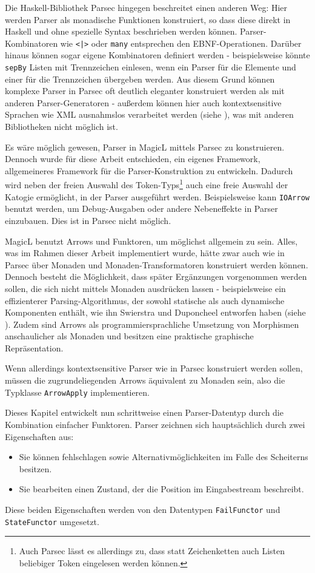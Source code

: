 \documentclass[11pt, a4paper, bibgerm]{scrbook}
\newcommand\icode[1]{\lstinline?#1?}
\begin{document}
Die Haskell-Bibliothek Parsec\cite{Parsec} hingegen beschreitet einen
anderen Weg: Hier werden Parser als monadische Funktionen konstruiert,
so dass diese direkt in Haskell und ohne spezielle Syntax beschrieben
werden können. Parser-Kombinatoren wie \icode{<|>} oder \icode{many}
entsprechen den EBNF-Operationen. Darüber hinaus können sogar eigene
Kombinatoren definiert werden - beispielsweise könnte \icode{sepBy}
Listen mit Trennzeichen einlesen, wenn ein Parser für die Elemente und
einer für die Trennzeichen übergeben werden. Aus diesem Grund können
komplexe Parser in Parsec oft deutlich eleganter konstruiert werden als
mit anderen Parser-Generatoren - außerdem können hier auch
kontextsensitive Sprachen wie XML ausnahmslos verarbeitet werden (siehe
\cite[S. 3]{Parsec}), was mit anderen Bibliotheken nicht möglich ist.

Es wäre möglich gewesen, Parser in MagicL mittels Parsec zu
konstruieren. Dennoch wurde für diese Arbeit entschieden, ein eigenes
Framework, allgemeineres Framework für die Parser-Konstruktion zu
entwickeln. Dadurch wird neben der freien Auswahl des
Token-Typs\footnote{Auch Parsec lässt es allerdings zu, dass statt
  Zeichenketten auch Listen beliebiger Token eingelesen werden können.}
auch eine freie Auswahl der Katogie ermöglicht, in der Parser ausgeführt
werden.  Beispielsweise kann \icode{IOArrow} benutzt werden, um
Debug-Ausgaben oder andere Nebeneffekte in Parser einzubauen. Dies ist
in Parsec nicht möglich.

MagicL benutzt Arrows und Funktoren, um möglichst allgemein zu
sein. Alles, was im Rahmen dieser Arbeit implementiert wurde, hätte zwar
auch wie in Parsec über Monaden und Monaden-Transformatoren konstruiert
werden können. Dennoch besteht die Möglichkeit, dass später Ergänzungen
vorgenommen werden sollen, die sich nicht mittels Monaden ausdrücken
lassen - beispielsweise ein effizienterer Parsing-Algorithmus, der
sowohl statische als auch dynamische Komponenten enthält, wie ihn
Swierstra und Duponcheel entworfen haben (siehe
\cite[S. 8ff]{Hughes}). Zudem sind Arrows als programmiersprachliche
Umsetzung von Morphismen anschaulicher als Monaden und besitzen eine
praktische graphische Repräsentation.

Wenn allerdings kontextsensitive Parser wie in Parsec konstruiert werden
sollen, müssen die zugrundeliegenden Arrows äquivalent zu Monaden sein,
also die Typklasse \icode{ArrowApply} implementieren.

Dieses Kapitel entwickelt nun schrittweise einen Parser-Datentyp durch
die Kombination einfacher Funktoren. Parser zeichnen sich hauptsächlich
durch zwei Eigenschaften aus:
\begin{itemize}
\item Sie können fehlschlagen sowie Alternativmöglichkeiten im Falle des
  Scheiterns besitzen.
\item Sie bearbeiten einen Zustand, der die Position im Eingabestream
  beschreibt.
\end{itemize}
Diese beiden Eigenschaften werden von den Datentypen \icode{FailFunctor}
und \icode{StateFunctor} umgesetzt.
\end{document}
